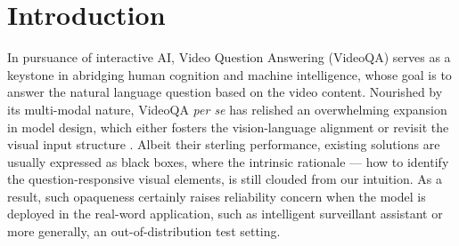 \section{Introduction}
\label{sec:introduction}





In pursuance of interactive AI, Video Question Answering (VideoQA) \cite{fan2019heterogeneous} serves as a keystone in abridging human cognition and machine intelligence, whose goal is to answer the natural language question based on the video content.   
%
Nourished by its multi-modal nature, VideoQA \textit{per se} has relished an overwhelming expansion in model design, which either fosters the vision-language alignment \cite{jiang2020reasoning,park2021bridge} or revisit the visual input structure \cite{le2021hierarchical,dang2021hierarchical}.
%
Albeit their sterling performance, existing solutions are usually expressed as black boxes, where the intrinsic rationale --- how to identify the question-responsive visual elements, is still clouded from our intuition. 
%
As a result, such opaqueness certainly raises reliability concern when the model is deployed in the real-word application, such as \ie intelligent surveillant assistant or more generally, an out-of-distribution test setting.


